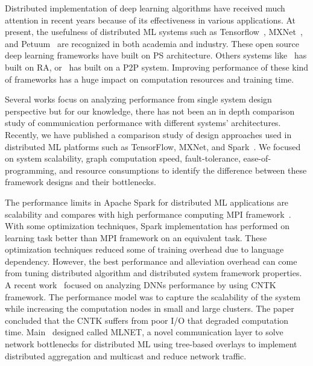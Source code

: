 \documentclass[conference]{IEEEtran}
\begin{document}
Distributed implementation of deep learning algorithms have received much attention in recent years because of its effectiveness in various applications. At present, the usefulness of distributed ML systems such as Tensorflow~\cite{abadi2016tensorflow}, MXNet~\cite{chen2015mxnet}, and Petuum~\cite{xing2015petuum} are recognized in both academia and industry. These open source deep learning frameworks have built on PS architecture. Others systems like~\cite{sergeev2018horovod} has built on RA, or~\cite{li2015malt} has built on a P2P system. Improving performance of these kind of frameworks has a huge impact on computation resources and training time. 

Several works focus on analyzing performance from single system design perspective but for our knowledge, there has not been an in depth comparison study of communication performance with different systems' architectures. Recently, we have published a comparison study of design approaches used in distributed ML platforms such as TensorFlow, MXNet, and Spark~\cite{KUO1}. We focused on system scalability, graph computation speed, fault-tolerance, ease-of-programming, and  resource consumptions to identify the difference between these framework designs and their bottlenecks. 

The performance limits in Apache Spark for distributed ML applications are scalability and compares with high performance computing MPI framework~\cite{Spark}. With some optimization techniques, Spark implementation has performed on learning task better than MPI framework on an equivalent task. These optimization techniques reduced some of training overhead due to language dependency. However, the best performance and alleviation overhead can come from tuning distributed algorithm and distributed system framework properties. A recent work~\cite{hashemi2016performance} focused on analyzing DNNs performance by using CNTK framework. The performance model was to capture the scalability of the system while increasing the computation nodes in small and large clusters. The paper concluded that the CNTK suffers from poor I/O that degraded computation time. Main~\cite{mai2015optimizing} designed called MLNET, a novel communication layer to solve network bottlenecks for distributed ML using tree-based overlays to implement distributed aggregation and multicast and reduce network traffic.

\end{document}
